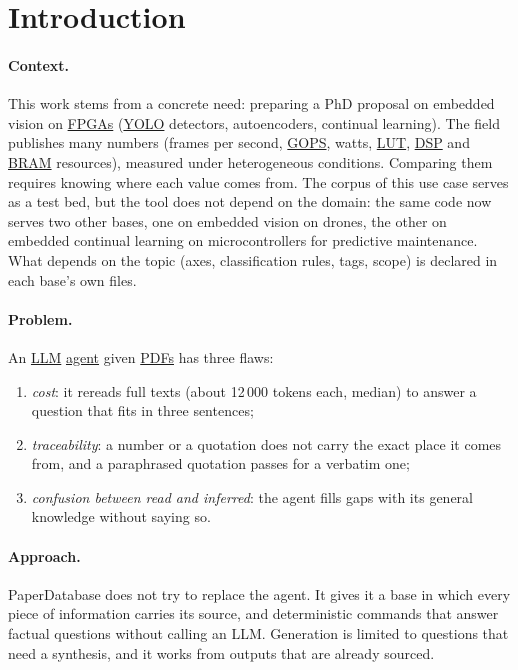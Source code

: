 \documentclass[11pt,a4paper]{article}
\newcommand{\gl}[2]{\hyperlink{gl:#1}{\textcolor{glcolor}{#2}}}
\begin{document}
\clearpage
\tableofcontents
\clearpage

\section{Introduction}

\paragraph{Context.} This work stems from a concrete need: preparing a PhD proposal on
embedded vision on \gl{FPGA}{FPGAs} (\gl{YOLO}{YOLO} detectors, autoencoders, continual learning).
The field publishes many numbers (frames per second, \gl{GOPS}{GOPS}, watts, \gl{LUT}{LUT}, \gl{DSP}{DSP} and \gl{BRAM}{BRAM}
resources), measured under heterogeneous conditions. Comparing them requires knowing where
each value comes from. The corpus of this use case serves as a test bed, but the tool does not
depend on the domain: the same code now serves two other bases, one on embedded vision on
drones, the other on embedded continual learning on microcontrollers for predictive
maintenance. What depends on the topic (axes, classification rules, tags, scope) is declared
in each base's own files.

\paragraph{Problem.} An \gl{LLM}{LLM} \gl{agent}{agent} given \gl{PDF}{PDFs} has three flaws:
\begin{enumerate}
  \item \emph{cost}: it rereads full texts (about 12\,000 tokens each, median) to answer a
    question that fits in three sentences;
  \item \emph{traceability}: a number or a quotation does not carry the exact place it
    comes from, and a paraphrased quotation passes for a verbatim one;
  \item \emph{confusion between read and inferred}: the agent fills gaps with its general
    knowledge without saying so.
\end{enumerate}

\paragraph{Approach.} PaperDatabase does not try to replace the agent. It gives it a base in
which every piece of information carries its source, and deterministic commands that answer
factual questions without calling an LLM. Generation is limited to questions that need a
synthesis, and it works from outputs that are already sourced.
\end{document}
